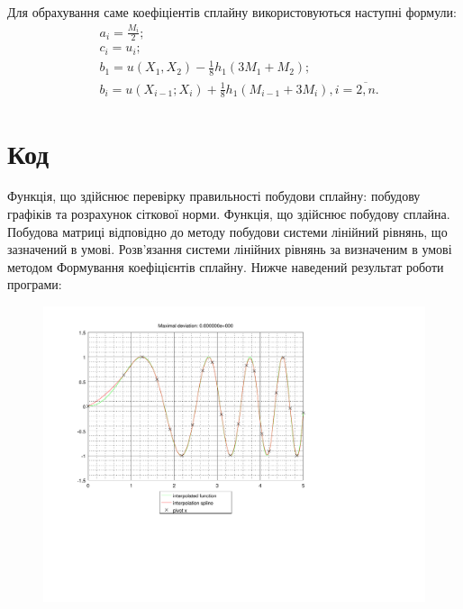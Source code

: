 \documentclass[titlepage]{article}
\newcommand\makelisting[1]{ \vspace{1cm}}
\begin{document}
Для обрахування саме коефіціентів сплайну використовуються наступні формули:
\begin{equation}
\begin{split}
&a_i = \frac{M_i}{2};\\
&c_i = u_i;\\
&b_1 = u(X_1, X_2) - \frac{1}{8}h_1(3M_1 + M_2);\\
&b_i = u(X_{i-1};X_i) + \frac{1}{8}h_1(M_{i-1} + 3M_i), i=\overline{2,n}.
\end{split}
\nonumber
\end{equation}
\vspace{20cm}
\section{Код}

Функція, що здійснює перевірку правильності побудови сплайну: побудову графіків та розрахунок сіткової норми.
\makelisting{main.m}
\vspace{20cm}
Функція, що здійснює побудову сплайна.
\makelisting{CreateSpline.m}
\vspace{20cm}
Побудова матриці відповідно до методу побудови системи лінійний рівнянь, що зазначений в умові.
\makelisting{CreateMatrix.m}
Розв'язання системи лінійних рівнянь за визначеним в умові методом
\makelisting{Solve.m}
Формування коефіцієнтів сплайну.
\makelisting{FormSpline.m}
Нижче наведений результат роботи програми:
\begin{figure}[h]
\hspace{-3cm}\includegraphics[page=1]{../result.pdf}
\end{figure}
\end{document}
